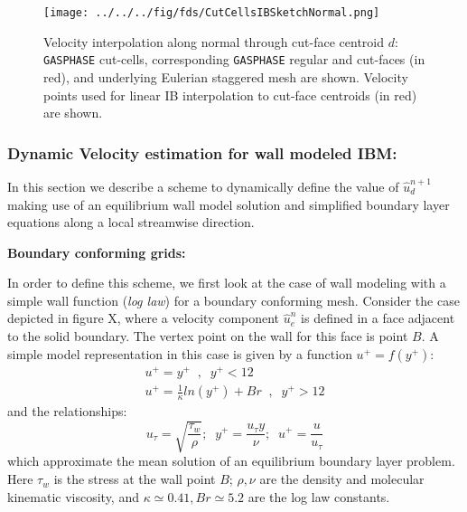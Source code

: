 \documentclass[12pt]{article}
\begin{document}
\begin{figure}[h]
      \centering
      \texttt{[image: ../../../fig/fds/CutCellsIBSketchNormal.png]}
      \caption{Velocity interpolation along normal through cut-face centroid $d$: \texttt{GASPHASE} cut-cells,  corresponding \texttt{GASPHASE} regular and cut-faces (in red), and underlying Eulerian staggered mesh are shown. Velocity points used for linear IB interpolation to cut-face centroids (in red) are shown. }
	\label{Fig:IBCart}
\end{figure}


\subsubsection{Dynamic Velocity estimation for wall modeled IBM:}

In this section we describe a scheme to dynamically define the value of $\hat{u}_d^{n+1}$ making use of an equilibrium wall model solution and simplified boundary layer equations along a local streamwise direction.

\bigskip
\noindent
\textbf{Boundary conforming grids:}
\bigskip

In order to define this scheme, we first look at the case of wall modeling with a simple wall function (\textit{log law}) for a boundary conforming mesh. Consider the case depicted in figure X, where a velocity component $\hat{u}_e^n$ is defined in a face adjacent to the solid boundary. The vertex point on the wall for this face is point $B$. A simple model representation in this case is given by a function $u^+ = f(y^+)$:
%
\begin{eqnarray}
   u^+ = y^+ \; \; , \; \; y^+ < 12 \\
   u^+ = \frac{1}{\kappa} ln(y^+) + Br \; \; , \; \; y^+ > 12
\end{eqnarray}
%
and the relationships:
%
\begin{equation}
   u_\tau = \sqrt{\frac{\tau_w}{\rho}}; \; \; y^+= \frac{u_\tau y}{\nu}; \; \; u^+=\frac{u}{u_\tau}
\end{equation}
%
which approximate the mean solution of an equilibrium boundary layer problem. Here $\tau_w$ is the stress at the wall point $B$; $\rho, \nu$ are the density and molecular kinematic viscosity, and $\kappa \simeq 0.41, Br \simeq 5.2$ are the log law constants.
\end{document}
